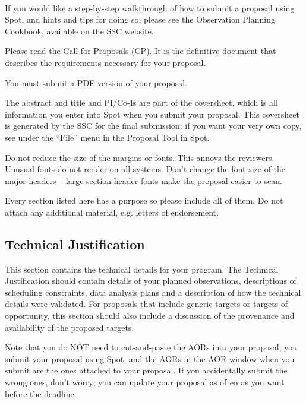 \documentclass[letterpaper,12pt]{article}
\begin{document}
\\
If you would like a step-by-step walkthrough of how to submit a
proposal using Spot, and hints and tips for doing so, please see
the Observation Planning Cookbook, available on the SSC website.\newline

Please read the Call for Proposals (CP). It is
the definitive document that describes the requirements
necessary for your proposal. \newline 

You must submit a PDF version of your proposal. \newline

  The abstract and title and PI/Co-Is are part of
the coversheet, which is all information you enter into Spot
when you submit your proposal.  This coversheet is generated by
the SSC for the final submission; if you want your very own
copy, see under the ``File'' menu in the Proposal Tool in Spot.\newline

Do not reduce the size of the margins or fonts.  This annoys the reviewers.
Unusual fonts do not render on all systems.  Don't change the
font size of the major headers --  large section header
fonts make the proposal easier to scan. \newline

Every section listed here has a purpose so please include all of them.
Do not attach any additional material, e.g. letters of endorsement.



\subsection{Technical Justification}

This section contains the technical details for your program. 
The Technical Justification should contain details of your planned observations, 
descriptions of scheduling constraints, data analysis plans and a 
description of how the technical details were validated. For proposals that 
include generic targets or targets of opportunity, this section should also 
include a discussion of the provenance and availability of the 
proposed targets.\newline

Note that you do NOT need to cut-and-paste the AORs into your
proposal; you submit your proposal using Spot, and the AORs in
the AOR window when you submit are the ones attached to your
proposal.  If you accidentally submit the wrong ones, don't worry;
you can update your proposal as often as you want before
the deadline.\newline
\end{document}
